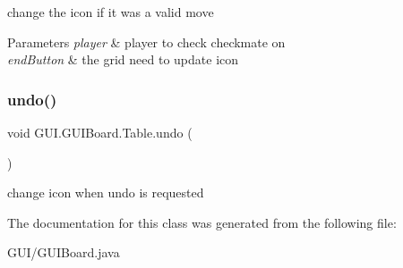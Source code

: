 change the icon if it was a valid move 
\begin{DoxyParams}{Parameters}
{\em player} & player to check checkmate on \\
\hline
{\em end\+Button} & the grid need to update icon \\
\hline
\end{DoxyParams}
\mbox{\label{class_g_u_i_1_1_g_u_i_board_1_1_table_abb7c7199330206d15dc1b072f93ecf6e}} 
\subsubsection{\texorpdfstring{undo()}{undo()}}
{\footnotesize\ttfamily void G\+U\+I.\+G\+U\+I\+Board.\+Table.\+undo (\begin{DoxyParamCaption}{ }\end{DoxyParamCaption})\hspace{0.3cm}{\ttfamily [inline]}}

change icon when undo is requested 

The documentation for this class was generated from the following file\+:\begin{DoxyCompactItemize}
\item 
G\+U\+I/G\+U\+I\+Board.\+java\end{DoxyCompactItemize}

